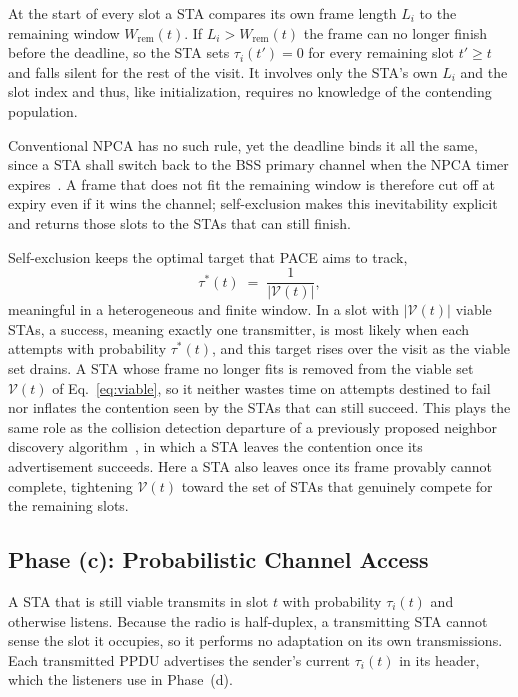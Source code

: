 \documentclass[conference]{IEEEtran}
\begin{document}
At the start of every slot a STA compares its own frame length $L_i$ to the remaining window $W_\mathrm{rem}(t)$. If $L_i > W_\mathrm{rem}(t)$ the frame can no longer finish before the deadline, so the STA sets $\tau_i(t')=0$ for every remaining slot $t'\ge t$ and falls silent for the rest of the visit. It involves only the STA's own $L_i$ and the slot index and thus, like initialization, requires no knowledge of the contending population.

Conventional NPCA has no such rule, yet the deadline binds it all the same, since a STA shall switch back to the BSS primary channel when the NPCA timer expires~\cite{ieee80211bn}. A frame that does not fit the remaining window is therefore cut off at expiry even if it wins the channel; self-exclusion makes this inevitability explicit and returns those slots to the STAs that can still finish.

Self-exclusion keeps the optimal target that PACE aims to track,
\begin{equation}
    \tau^*(t) \;=\; \frac{1}{|\mathcal{V}(t)|},
    \label{eq:tau_opt}
\end{equation}
meaningful in a heterogeneous and finite window. In a slot with $|\mathcal{V}(t)|$ viable STAs, a success, meaning exactly one transmitter, is most likely when each attempts with probability $\tau^*(t)$, and this target rises over the visit as the viable set drains. A STA whose frame no longer fits is removed from the viable set $\mathcal{V}(t)$ of Eq.~\eqref{eq:viable}, so it neither wastes time on attempts destined to fail nor inflates the contention seen by the STAs that can still succeed. This plays the same role as the collision detection departure of a previously proposed neighbor discovery algorithm~\cite{song2014pnd}, in which a STA leaves the contention once its advertisement succeeds. Here a STA also leaves once its frame provably cannot complete, tightening $\mathcal{V}(t)$ toward the set of STAs that genuinely compete for the remaining slots.

\subsection{Phase (c): Probabilistic Channel Access}
\label{subsec:channel_access}

A STA that is still viable transmits in slot $t$ with probability $\tau_i(t)$ and otherwise listens. Because the radio is half-duplex, a transmitting STA cannot sense the slot it occupies, so it performs no adaptation on its own transmissions. Each transmitted PPDU advertises the sender's current $\tau_i(t)$ in its header, which the listeners use in Phase~(d).
\end{document}
